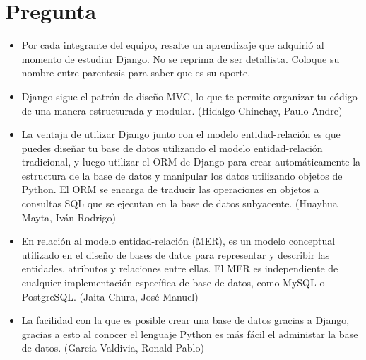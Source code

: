 \documentclass{article}
\begin{document}
    \section{Pregunta}
    \begin{itemize}
        \item Por cada integrante del equipo, resalte un aprendizaje que adquirió al momento de estudiar
        Django. No se reprima de ser detallista. Coloque su nombre entre parentesis para saber que es
        su aporte.
        \item Django sigue el patrón de diseño MVC, lo que te permite organizar tu código de una manera estructurada y modular. (Hidalgo Chinchay, Paulo Andre)
        \item La ventaja de utilizar Django junto con el modelo entidad-relación es que puedes diseñar tu base de datos utilizando el modelo entidad-relación tradicional, y luego utilizar el ORM de Django para crear automáticamente la estructura de la base de datos y manipular los datos utilizando objetos de Python. El ORM se encarga de traducir las operaciones en objetos a consultas SQL que se ejecutan en la base de datos subyacente. (Huayhua Mayta, Iván Rodrigo) 
        \item En relación al modelo entidad-relación (MER), es un modelo conceptual utilizado en el diseño de bases de datos para representar y describir las entidades, atributos y relaciones entre ellas. El MER es independiente de cualquier implementación específica de base de datos, como MySQL o PostgreSQL. (Jaita Chura, José Manuel)
        \item La facilidad con la que es posible crear una base de datos gracias a Django, gracias a esto al conocer el lenguaje Python es más fácil el administar la base de datos. (Garcia Valdivia, Ronald Pablo) 
    \end{itemize}
    
\end{document}
